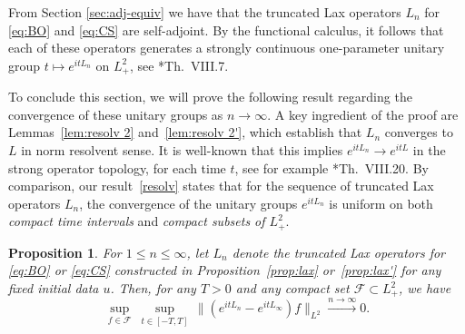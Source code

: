 \documentclass [11pt] {article}
\newtheorem{prop}[thm]{Proposition}
\newcommand{\<}{\langle}
\renewcommand{\>}{\rangle}
\newcommand{\mc}[1]{\mathcal{#1}}
\begin{document}
From Section \ref{sec:adj-equiv} we have that the truncated Lax operators $L_n$ for \eqref{eq:BO} and \eqref{eq:CS} are self-adjoint.  By the functional calculus, it follows that each of these operators generates a strongly continuous one-parameter unitary group $t\mapsto e^{itL_n}$ on $L^2_{+}$, see \cite{ReedSimonvol1}*{Th.~VIII.7}.

To conclude this section, we will prove the following result regarding the convergence of these unitary groups as $n\to\infty$.  A key ingredient of the proof are Lemmas~\ref{lem:resolv 2} and~\ref{lem:resolv 2'}, which establish that $L_n$ converges to $L$ in norm resolvent sense.  It is well-known that this implies $e^{itL_n}\to e^{itL}$ in the strong operator topology, for each time $t$, see for example \cite{ReedSimonvol1}*{Th.~VIII.20}.  By comparison, our result~\eqref{resolv} states that for the sequence of truncated Lax operators $L_n$, the convergence of the unitary groups $e^{itL_n}$ is uniform on both {\it compact time intervals} and {\it compact subsets of $L^2_+$}.
\begin{prop}\label{lem:resolv}
For $1\leq n\leq \infty$, let $L_n$ denote the truncated Lax operators for \eqref{eq:BO} or \eqref{eq:CS} constructed in Proposition~\ref{prop:lax} or~\ref{prop:lax'} for any fixed initial data $u$.  Then, for any $T>0$ and any compact set $\mc{F}\subset L^2_{+}$, we have
\begin{equation}
\sup_{f\in \mathcal{F}}\ \sup_{t\in[-T,T]}\, \| (e^{itL_n} - e^{itL_\infty})f \|_{L^2} \xrightarrow{n \to \infty} 0.
\label{resolv}
\end{equation}
\end{prop}
\end{document}

